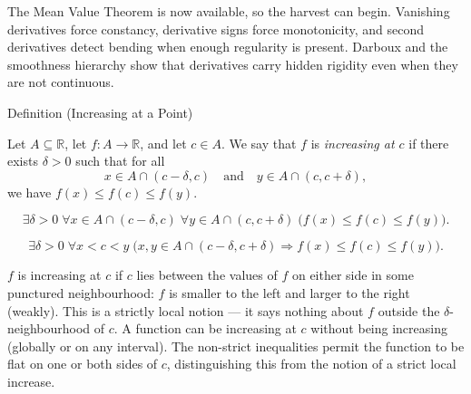 
\begin{remark*}[Interpretation]
The Mean Value Theorem is now available, so the harvest can begin. Vanishing
derivatives force constancy, derivative signs force monotonicity, and second
derivatives detect bending when enough regularity is present. Darboux and the
smoothness hierarchy show that derivatives carry hidden rigidity even when
they are not continuous.
\end{remark*}

\begin{definitionbox}{Definition (Increasing at a Point)}
\begin{definition}
\label{def:increasing-at-a-point}
Let $A \subseteq \mathbb{R}$, let $f : A \to \mathbb{R}$, and let $c \in A$. We say that $f$ is \emph{increasing at $c$} if there exists $\delta > 0$ such that for all
\[
x \in A \cap (c-\delta,c)
\quad \text{and} \quad
y \in A \cap (c,c+\delta),
\]
we have $f(x) \leq f(c) \leq f(y)$.
\end{definition}
\end{definitionbox}

\begin{remark*}
\[
\exists \delta > 0\;\forall x \in A \cap (c-\delta,c)\;\forall y \in A \cap (c,c+\delta)
\;\bigl(f(x) \leq f(c) \leq f(y)\bigr).
\]
\end{remark*}

\begin{remark*}
\[
\exists \delta>0\;\forall x<c<y\;
\bigl(x,y\in A\cap(c-\delta,c+\delta)\Rightarrow f(x)\le f(c)\le f(y)\bigr).
\]
\end{remark*}

\begin{remark*}[Interpretation]
$f$ is increasing at $c$ if $c$ lies between the values of $f$ on either side in some punctured neighbourhood: $f$ is smaller to the left and larger to the right (weakly). This is a strictly local notion --- it says nothing about $f$ outside the $\delta$-neighbourhood of $c$. A function can be increasing at $c$ without being increasing (globally or on any interval). The non-strict inequalities permit the function to be flat on one or both sides of $c$, distinguishing this from the notion of a strict local increase.
\end{remark*}

